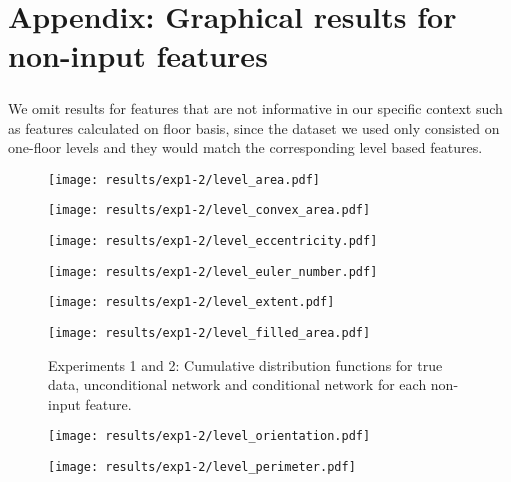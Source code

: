 \chapter{Appendix: Graphical results for non-input features}
\paragraph{} We omit results for features that are not informative in our specific context such as features calculated on floor basis, since the dataset we used only consisted on one-floor levels and they would match the corresponding level based features.
\label{sec:appendix-graphs}
\begin{figure}[ht]
	\begin{minipage}[b]{0.45\linewidth}
		\centering
		\texttt{[image: results/exp1-2/level\_area.pdf]} 
		\label{fig:results-noninput-level_area}
	\end{minipage}
	\begin{minipage}[b]{0.45\linewidth}
		\centering
		\texttt{[image: results/exp1-2/level\_convex\_area.pdf]} 
		\label{fig:results-noninput-level_convex_area}
	\end{minipage} 
	
	
	\begin{minipage}[b]{0.45\linewidth}
		\centering
		\texttt{[image: results/exp1-2/level\_eccentricity.pdf]} 
		\label{fig:results-noninput-level_eccentricity}
	\end{minipage}
	\begin{minipage}[b]{0.45\linewidth}
		\centering
		\texttt{[image: results/exp1-2/level\_euler\_number.pdf]} 
		\label{fig:results-noninput-level_euler_number}
	\end{minipage} 
	
	
	\begin{minipage}[b]{0.45\linewidth}
		\centering
		\texttt{[image: results/exp1-2/level\_extent.pdf]} 
		\label{fig:results-noninput-level_extent}
	\end{minipage}
	\begin{minipage}[b]{0.45\linewidth}
		\centering
		\texttt{[image: results/exp1-2/level\_filled\_area.pdf]} 
		\label{fig:results-noninput-level_filled_area}
	\end{minipage} 
	
	
	\caption[Graphical results for experiments 1 and 2]{Experiments 1 and 2: Cumulative distribution functions for true data, unconditional network and conditional network for each non-input feature.}
\end{figure}\begin{figure}[ht]
	\begin{minipage}[b]{0.45\linewidth}
		\centering
		\texttt{[image: results/exp1-2/level\_orientation.pdf]} 
		\label{fig:results-noninput-level_orientation}
	\end{minipage}
	\begin{minipage}[b]{0.45\linewidth}
		\centering
		\texttt{[image: results/exp1-2/level\_perimeter.pdf]} 
		\label{fig:results-noninput-level_perimeter}
	\end{minipage} 
	

\end{figure}
